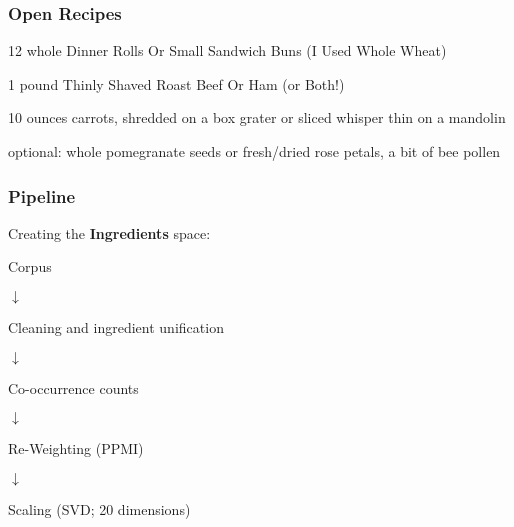 \documentclass{beamer}
\begin{document}
\begin{frame}
    \frametitle{Open Recipes}

    {\tt

        \footnotesize{12 whole Dinner Rolls Or Small Sandwich Buns (I Used Whole Wheat)}

        \footnotesize{1 pound Thinly Shaved Roast Beef Or Ham (or Both!)}

        \footnotesize{10 ounces carrots, shredded on a box grater or sliced whisper thin on a mandolin}

        \footnotesize{optional: whole pomegranate seeds or fresh/dried rose petals, a bit of bee pollen}
    }\pause

    \vspace{0.5cm}
    \centering

\end{frame}

\begin{frame}
    \frametitle{Pipeline}
    Creating the \textbf{Ingredients} space:
    \vspace{0.2cm}

    \begin{center}

    Corpus

    $\downarrow$

    Cleaning and ingredient unification

    $\downarrow$

    Co-occurrence counts

    $\downarrow$

    Re-Weighting (PPMI)

    $\downarrow$

    Scaling (SVD; 20 dimensions)

\end{center}

\end{frame}
\end{document}
